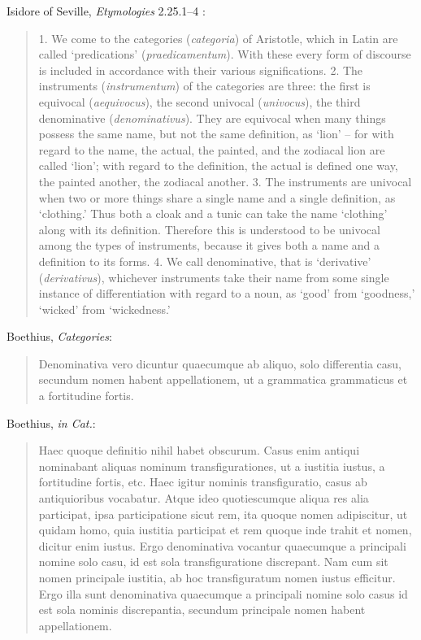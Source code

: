 \documentclass{article}
\begin{document}
Isidore of Seville, {\em Etymologies} 2.25.1--4 \cite[p.~81]{isidore}:

\begin{quote}
1. We come to the categories ({\em categoria}) of Aristotle, which in Latin are called `predications' ({\em praedicamentum}). With these every form of discourse is included in accordance with their various significations. 2. The instruments ({\em instrumentum}) of the categories are three: the first is equivocal ({\em aequivocus}), the second univocal ({\em univocus}), the third denominative ({\em denominativus}). They are equivocal when many things possess the same name, but not the same definition, as `lion' -- for with regard to the name, the actual, the painted, and the zodiacal lion are called `lion'; with regard to the definition, the actual is defined one way, the painted another, the zodiacal another. 3. The instruments are univocal when two or more things share a single name and a single definition, as `clothing.' Thus both a cloak and a tunic can take the name `clothing' along with its definition. Therefore this is understood to be univocal among the types of instruments, because it gives both a name and a definition to its forms. 4. We call denominative, that is `derivative' ({\em derivativus}), whichever instruments take their name from some single instance of differentiation with regard to a noun, as `good' from `goodness,' `wicked' from `wickedness.'
\end{quote}















Boethius, {\em Categories}:

\begin{quote}
Denominativa vero dicuntur quaecumque ab aliquo, solo differentia casu, secundum nomen habent appellationem, ut a grammatica grammaticus et a fortitudine fortis.
\end{quote}

Boethius, {\em in Cat.}:

\begin{quote}
Haec quoque definitio nihil habet obscurum. Casus enim antiqui nominabant aliquas nominum transfigurationes, ut a iustitia iustus, a fortitudine fortis, etc. Haec igitur nominis transfiguratio, casus ab antiquioribus vocabatur. Atque ideo quotiescumque aliqua res alia participat, ipsa participatione sicut rem, ita quoque nomen adipiscitur, ut quidam homo, quia iustitia participat et rem quoque inde trahit et nomen, dicitur enim iustus. Ergo denominativa vocantur quaecumque a principali nomine solo casu, id est sola transfiguratione discrepant. Nam cum sit nomen principale iustitia, ab hoc transfiguratum nomen iustus efficitur. Ergo illa sunt denominativa quaecumque a principali nomine solo casus id est sola nominis discrepantia, secundum principale nomen habent appellationem.
\end{quote}
\end{document}
